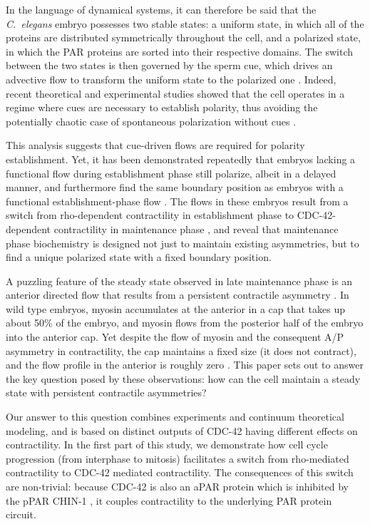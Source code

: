 \documentclass[11pt]{article}
\newcommand{\6}[1]{#1_{\text{6}}}
\newcommand{\3}[1]{#1_{\text{3}}}
\begin{document}
In the language of dynamical systems, it can therefore be said that the \emph{C.\ elegans} embryo possesses two stable states: a uniform state, in which all of the proteins are distributed symmetrically throughout the cell, and a polarized state, in which the PAR proteins are sorted into their respective domains. The switch between the two states is then governed by the sperm cue, which drives an advective flow to transform the uniform state to the polarized one \cite{goehring2011polarization, gross2019guiding}. Indeed, recent theoretical and experimental studies showed that the cell operates in a regime where cues are necessary to establish polarity, thus avoiding the potentially chaotic case of spontaneous polarization without cues \cite{gross2019guiding}.

This analysis suggests that cue-driven flows are required for polarity establishment. Yet, it has been demonstrated repeatedly that embryos lacking a functional flow during establishment phase still polarize, albeit in a delayed manner, and furthermore find the same boundary position as embryos with a functional establishment-phase flow \cite{zonies2010symmetry, tse2012rhoa}. The flows in these embryos result from a switch from rho-dependent contractility in establishment phase to CDC-42-dependent contractility in maintenance phase \cite{schonegg2006cdc}, and reveal that maintenance phase biochemistry is designed not just to maintain existing asymmetries, but to find a unique polarized  state with a fixed boundary position.

A puzzling feature of the steady state observed in late maintenance phase is an anterior directed flow that results from a persistent contractile asymmetry \cite{sailer2015dynamic}. In wild type embryos, myosin accumulates at the anterior in a cap that takes up about 50\% of the embryo, and myosin flows from the posterior half of the embryo into the anterior cap. Yet despite the flow of myosin and the consequent A/P asymmetry in contractility, the cap maintains a fixed size (it does not contract), and the flow profile in the anterior is roughly zero \cite{sailer2015dynamic}. This paper sets out to answer the key question posed by these observations: how can the cell maintain a steady state with persistent contractile asymmetries?  

Our answer to this question combines experiments and continuum theoretical modeling, and is based on distinct outputs of CDC-42 having different effects on contractility. In the first part of this study, we demonstrate how cell cycle progression (from interphase to mitosis) facilitates a switch from rho-mediated contractility \cite{schonegg2007rho, michaux2018excitable, michaud2022versatile} to CDC-42 mediated contractility. The consequences of this switch are non-trivial: because CDC-42 is also an aPAR protein which is inhibited by the pPAR CHIN-1 \cite{sailer2015dynamic}, it couples contractility to the underlying PAR protein circuit.
\end{document}
